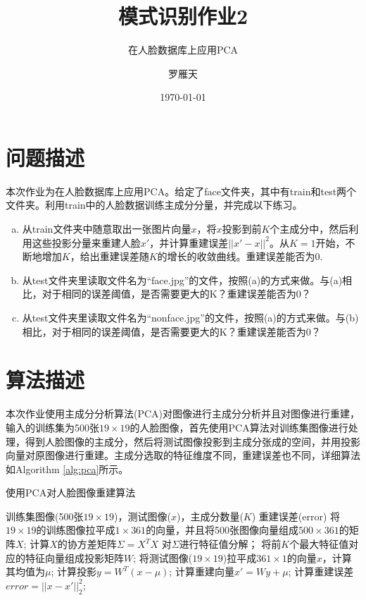 \documentclass[cn]{elegantbook}
\title{模式识别作业2}
\subtitle{在人脸数据库上应用PCA}
\author{罗雁天}
\institute{清华大学电子系}
\date{\today}
\begin{document}
\maketitle
\tableofcontents
\mainmatter
\hypersetup{pageanchor=true}
\chapter{问题描述}

本次作业为在人脸数据库上应用PCA。给定了face文件夹，其中有train和test两个文件夹。利用train中的人脸数据训练主成分分量，并完成以下练习。
\begin{enumerate}[(a)]
	\item 从train文件夹中随意取出一张图片向量$x$，将$x$投影到前$K$个主成分中，然后利用这些投影分量来重建人脸$x'$，并计算重建误差$||x'-x||^2$。从$K=1$开始，不断地增加$K$，给出重建误差随$K$的增长的收敛曲线。重建误差能否为0.
	\item 从test文件夹里读取文件名为“face.jpg”的文件，按照(a)的方式来做。与(a)相比，对于相同的误差阈值，是否需要更大的K？重建误差能否为0？
	\item 从test文件夹里读取文件名为“nonface.jpg”的文件，按照(a)的方式来做。与(b)相比，对于相同的误差阈值，是否需要更大的K？重建误差能否为0？
\end{enumerate}

\chapter{算法描述}
本次作业使用主成分分析算法(PCA)对图像进行主成分分析并且对图像进行重建，输入的训练集为500张$19\times 19$的人脸图像，首先使用PCA算法对训练集图像进行处理，得到人脸图像的主成分，然后将测试图像投影到主成分张成的空间，并用投影向量对原图像进行重建。主成分选取的特征维度不同，重建误差也不同，详细算法如Algorithm \ref{alg:pca}所示。

\begin{algorithm}[H]
	\caption{\label{alg:pca}使用PCA对人脸图像重建算法}
	\begin{algorithmic}[1]
		\Require 训练集图像(500张$19\times19$)，测试图像($x$)，主成分数量($K$)
		\Ensure 重建误差(error)
		\State 将$19\times 19$的训练图像拉平成$1\times 361$的向量，并且将500张图像向量组成$500\times 361$的矩阵$X$;
		\State 计算$X$的协方差矩阵$\Sigma = X^TX$
		\State 对$\Sigma$进行特征值分解；
		\State 将前$K$个最大特征值对应的特征向量组成投影矩阵$W$;
		\State 将测试图像($19\times 19$)拉平成$361\times1$的向量$x$，计算其均值为$\mu$;
		\State 计算投影$y=W^T(x-\mu)$;
		\State 计算重建向量$x'=Wy+\mu$;
		\State 计算重建误差$error=||x-x'||_2^2$;
	\end{algorithmic}
\end{algorithm}
\end{document}
